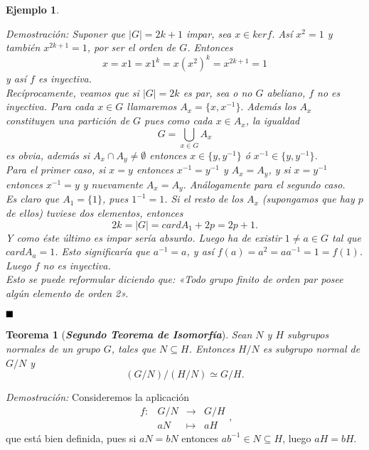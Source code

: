 \documentclass[12pt]{article}
\newtheorem{theorem}{Teorema}[section]
\newtheorem{example}{Ejemplo}[theorem]
\begin{document}
\begin{example}
\begin{enumerate}
\emph{Demostración: } Suponer que $|G| = 2k+1$ impar, sea $x \in ker f$. Así $x^{2} = 1$ y también $x^{2k+1} = 1$, por ser el orden de $G$. Entonces $$x = x1 = x1^{k} = x(x^{2})^{k} = x^{2k+1} = 1$$ y así $f$ es inyectiva.\vspace{0.2cm}\\
Recíprocamente, veamos que si $|G| = 2k$ es par, sea o no $G$ abeliano, $f$ no es inyectiva. Para cada $x \in G$ llamaremos $A_{x} = \lbrace x, x^{-1}\rbrace.$ Además los $A_{x}$ constituyen una partición de $G$ pues como cada $x \in A_{x}$, la igualdad $$G = \bigcup_{x \in G} A_{x}$$ es obvia, además si $A_{x}\cap A_{y} \neq \emptyset$ entonces $x \in \lbrace y, y^{-1}\rbrace$ ó $x^{-1} \in \lbrace y,y^{-1}\rbrace$.\vspace{0.2cm}\\
Para el primer caso, si $x = y$ entonces $x^{-1} = y^{-1}$ y $A_{x} = A_{y}$, y si $x = y^{-1}$ entonces $x^{-1} = y$ y nuevamente $A_{x} = A_{y}$. Análogamente para el segundo caso.\vspace{0.2cm}\\ Es claro que $A_{1} = \lbrace 1 \rbrace$, pues $1^{-1} = 1$. Si el resto de los $A_{x}$ (supongamos que hay $p$ de ellos) tuviese dos elementos, entonces $$2k = |G| = card A_{1} + 2p = 2p +1.$$ Y como éste último es impar sería absurdo. Luego ha de existir $1 \neq a \in G$ tal que $card A_{a} = 1$. Esto significaría que $a^{-1} = a$, y así $f(a) = a^{2} = aa^{-1} = 1 = f(1)$. Luego $f$ no es inyectiva.\vspace{0.2cm}\\
Esto se puede reformular diciendo que: \textit{«Todo grupo finito de orden par posee algún elemento de orden 2»}. 
\end{enumerate}
\end{example}
$\hfill \blacksquare$

\begin{theorem}[\textbf{\textit{Segundo Teorema de Isomorfía}}]
Sean $N$ y $H$ subgrupos normales de un grupo $G$, tales que $N \subseteq H$. Entonces $H/N$ es subgrupo normal de $G/N$ y $$(G/N)/(H/N) \simeq G/H.$$
\end{theorem}
\emph{Demostración: }Consideremos la aplicación $$\begin{array}{rccl}
f\colon &G/N & \longrightarrow & G/H\\
&aN& \longmapsto &aH
\end{array}
,$$ que está bien definida, pues si $aN = bN$ entonces $ab^{-1} \in N \subseteq H$, luego $aH = bH$.
\end{document}
